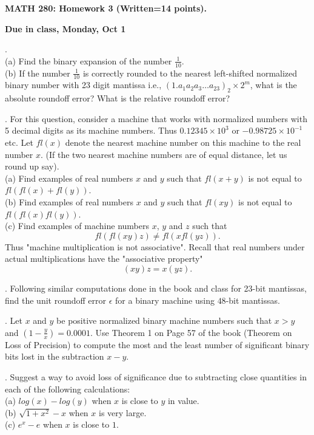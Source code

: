 \documentclass[12 pt]{article}
\begin{document}
\centerline{\bf MATH 280: Homework 3 (Written=14 points). }
\centerline{\bf Due in class, Monday, Oct 1}

\bigskip

. \\
(a) Find the binary expansion of the number $\frac{1}{10}$. \\
(b) If the number $\frac{1}{10}$ is correctly rounded to the nearest 
left-shifted normalized binary number with 23 digit mantissa i.e., 
$(1.a_1a_2a_3 \dots a_{23})_2 \times 2^m$, what is the absolute 
roundoff error? What is the relative roundoff error?

\medskip

. For this question, consider a machine that works with normalized numbers with 5 decimal digits as its machine numbers. 
Thus $0.12345 \times 10^3$ or $-0.98725 \times 10^{-1}$ etc. Let $fl(x)$ denote the nearest machine number on this machine to the real number $x$. 
(If the two nearest machine numbers are of equal distance, let us round up say). \\
(a) Find examples of real numbers $x$ and $y$ such that $fl(x+y)$ is not equal to $fl(fl(x)+fl(y))$. \\
(b) Find examples of real numbers $x$ and $y$ such that $fl(xy)$ is not equal to $fl(fl(x) fl(y))$. \\
(c) Find examples of machine numbers $x$, $y$ and $z$ such that $$fl(fl(xy) z) \neq fl(x fl(yz)).$$Thus "machine multiplication is not associative". 
Recall that real numbers under actual multiplications have the "associative property" $$(xy)z=x(yz).$$



\medskip

. Following similar computations done in the book and class for 23-bit mantissas, find the unit roundoff error $\epsilon$ for a binary machine 
using $48$-bit mantissas.
\medskip

\medskip

. Let $x$ and $y$ be positive normalized binary machine numbers such that $x > y$ and $(1-\frac{y}{x}) = 0.0001$. Use Theorem 1 on Page 57 of the book 
(Theorem on Loss of Precision) to compute the most and the least number of significant binary bits lost in the subtraction $x-y$.

\medskip

. Suggest a way to avoid loss of significance due to subtracting close quantities in each of the following calculations: \\
(a) $log(x)-log(y)$  when $x$ is close to $y$ in value. \\
(b) $\sqrt{1+x^2} - x$ when $x$ is very large. \\
(c) $e^x - e$ when $x$ is close to $1$. 
\end{document}
